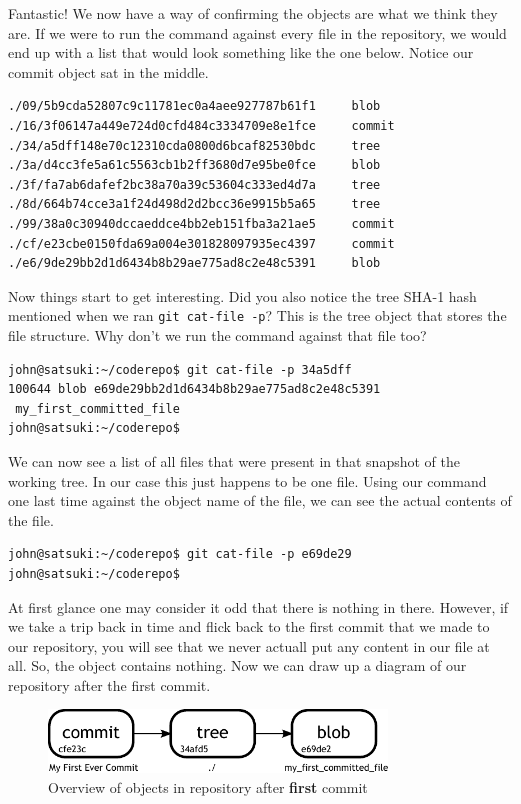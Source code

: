 Fantastic!  We now have a way of confirming the objects are what we think they are.
If we were to run the command against every file in the repository, we would end up with a list that would look something like the one below.
Notice our commit object sat in the middle.

\begin{Verbatim}
./09/5b9cda52807c9c11781ec0a4aee927787b61f1     blob
./16/3f06147a449e724d0cfd484c3334709e8e1fce     commit
./34/a5dff148e70c12310cda0800d6bcaf82530bdc     tree
./3a/d4cc3fe5a61c5563cb1b2ff3680d7e95be0fce     blob
./3f/fa7ab6dafef2bc38a70a39c53604c333ed4d7a     tree
./8d/664b74cce3a1f24d498d2d2bcc36e9915b5a65     tree
./99/38a0c30940dccaeddce4bb2eb151fba3a21ae5     commit
./cf/e23cbe0150fda69a004e301828097935ec4397     commit
./e6/9de29bb2d1d6434b8b29ae775ad8c2e48c5391     blob
\end{Verbatim}

Now things start to get interesting.
Did you also notice the tree SHA-1 hash mentioned when we ran \texttt{git cat-file -p}?  This is the tree object that stores the file structure.
Why don't we run the command against that file too?

\begin{Verbatim}
john@satsuki:~/coderepo$ git cat-file -p 34a5dff
100644 blob e69de29bb2d1d6434b8b29ae775ad8c2e48c5391
 my_first_committed_file
john@satsuki:~/coderepo$
\end{Verbatim}

We can now see a list of all files that were present in that snapshot of the working tree.
In our case this just happens to be one file.
Using our command one last time against the object name of the file, we can see the actual contents of the file.

\begin{Verbatim}
john@satsuki:~/coderepo$ git cat-file -p e69de29
john@satsuki:~/coderepo$
\end{Verbatim}

At first glance one may consider it odd that there is nothing in there.
However, if we take a trip back in time and flick back to the first commit that we made to our repository, you will see that we never actuall put any content in our file at all.
So, the object contains nothing.
Now we can draw up a diagram of our repository after the first commit.

\begin{figure}[hbt]
\centering
\includegraphics[width=9cm]{images/f-af2-d2.pdf}
\caption{Overview of objects in repository after \textbf{first} commit}
\end{figure}

